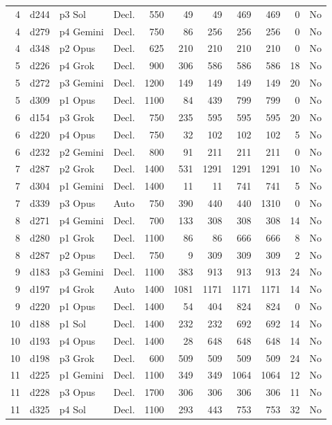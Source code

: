 \begin{longtable}{r l l l r r r r r r l}
4 & d244 & p3 Sol & Decl. & 550 & 49 & 49 & 469 & 469 & 0 & No \\
4 & d279 & p4 Gemini & Decl. & 750 & 86 & 256 & 256 & 256 & 0 & No \\
4 & d348 & p2 Opus & Decl. & 625 & 210 & 210 & 210 & 210 & 0 & No \\
5 & d226 & p4 Grok & Decl. & 900 & 306 & 586 & 586 & 586 & 18 & No \\
5 & d272 & p3 Gemini & Decl. & 1200 & 149 & 149 & 149 & 149 & 20 & No \\
5 & d309 & p1 Opus & Decl. & 1100 & 84 & 439 & 799 & 799 & 0 & No \\
6 & d154 & p3 Grok & Decl. & 750 & 235 & 595 & 595 & 595 & 20 & No \\
6 & d220 & p4 Opus & Decl. & 750 & 32 & 102 & 102 & 102 & 5 & No \\
6 & d232 & p2 Gemini & Decl. & 800 & 91 & 211 & 211 & 211 & 0 & No \\
7 & d287 & p2 Grok & Decl. & 1400 & 531 & 1291 & 1291 & 1291 & 10 & No \\
7 & d304 & p1 Gemini & Decl. & 1400 & 11 & 11 & 741 & 741 & 5 & No \\
7 & d339 & p3 Opus & Auto & 750 & 390 & 440 & 440 & 1310 & 0 & No \\
8 & d271 & p4 Gemini & Decl. & 700 & 133 & 308 & 308 & 308 & 14 & No \\
8 & d280 & p1 Grok & Decl. & 1100 & 86 & 86 & 666 & 666 & 8 & No \\
8 & d287 & p2 Opus & Decl. & 750 & 9 & 309 & 309 & 309 & 2 & No \\
9 & d183 & p3 Gemini & Decl. & 1100 & 383 & 913 & 913 & 913 & 24 & No \\
9 & d197 & p4 Grok & Auto & 1400 & 1081 & 1171 & 1171 & 1171 & 14 & No \\
9 & d220 & p1 Opus & Decl. & 1400 & 54 & 404 & 824 & 824 & 0 & No \\
10 & d188 & p1 Sol & Decl. & 1400 & 232 & 232 & 692 & 692 & 14 & No \\
10 & d193 & p4 Opus & Decl. & 1400 & 28 & 648 & 648 & 648 & 14 & No \\
10 & d198 & p3 Grok & Decl. & 600 & 509 & 509 & 509 & 509 & 24 & No \\
11 & d225 & p1 Gemini & Decl. & 1100 & 349 & 349 & 1064 & 1064 & 12 & No \\
11 & d228 & p3 Opus & Decl. & 1700 & 306 & 306 & 306 & 306 & 11 & No \\
11 & d325 & p4 Sol & Decl. & 1100 & 293 & 443 & 753 & 753 & 32 & No \\

\end{longtable}
